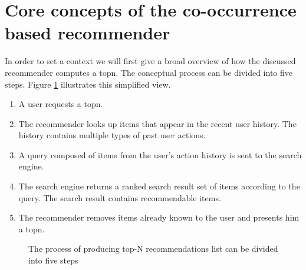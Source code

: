 \section{Core concepts of the co-occurrence based recommender}
\label{sec:design}

In order to set a context we will first give a broad overview of how the discussed recommender computes a \gls{topn}.
The conceptual process can be divided into five steps. Figure \ref{fig:topndataflow} illustrates this simplified view.

\begin{enumerate}
\item A user requests a \gls{topn}.
\item The recommender looks up items that appear in the recent user history. The history contains multiple types of past user actions.
\item A query composed of items from the user's action history is sent to the search engine.
\item The search engine returns a ranked search result set of items according to the query. The search result contains recommendable items.
\item The recommender removes items already known to the user and pre\-sents him a \gls{topn}.
\end{enumerate}


\begin{figure}
  \centering
  \caption{The process of producing top-N recommendations list can be divided into five steps}
  \label{fig:topndataflow}
\end{figure}

